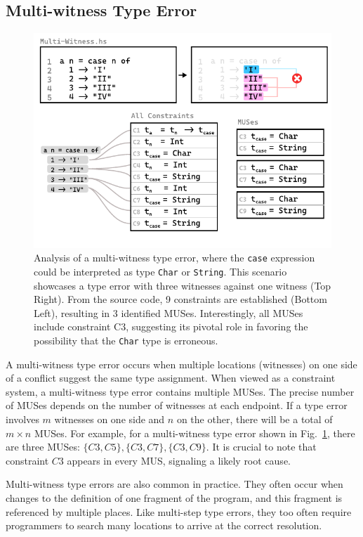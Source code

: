 \documentclass[pdflatex,lineno,sn-nature,Numbered]{sn-jnl}%
\begin{document}
\subsection{Multi-witness Type Error} \label{sec:multi-witness}

\begin{figure}[hbt]
    \centering
\includegraphics[width=0.8\linewidth]{images/Multi-Witness-MUS}
  \caption{\label{fig:multi-witness-2}
    Analysis of a multi-witness type error, where the \texttt{case} expression could be interpreted as type \texttt{Char} or \texttt{String}. This scenario showcases a type error with three witnesses against one witness (Top Right). From the source code, 9 constraints are established (Bottom Left), resulting in 3 identified MUSes. Interestingly, all MUSes include constraint C3, suggesting its pivotal role in favoring the possibility that the \texttt{Char} type is erroneous.
  }
  \end{figure}

A multi-witness type error occurs when multiple locations (witnesses) on one side of a conflict suggest the same type assignment. When viewed as a constraint system, a multi-witness type error contains multiple MUSes. The precise number of MUSes depends on the number of witnesses at each endpoint. If a type error involves $m$ witnesses on one side and $n$ on the other, there will be a total of $m \times n$ MUSes. For example, for a multi-witness type error shown in Fig.~\ref{fig:multi-witness-2}, there are three MUSes: $\{C3, C5\}, \{C3, C7\}, \{C3, C9\}$. It is crucial to note that constraint $C3$ appears in every MUS, signaling a likely root cause.

Multi-witness type errors are also common in practice. They often occur when changes to the definition of one fragment of the program, and this fragment is referenced by multiple places. Like multi-step type errors, they too often require programmers to search many locations to arrive at the correct resolution.
\end{document}
